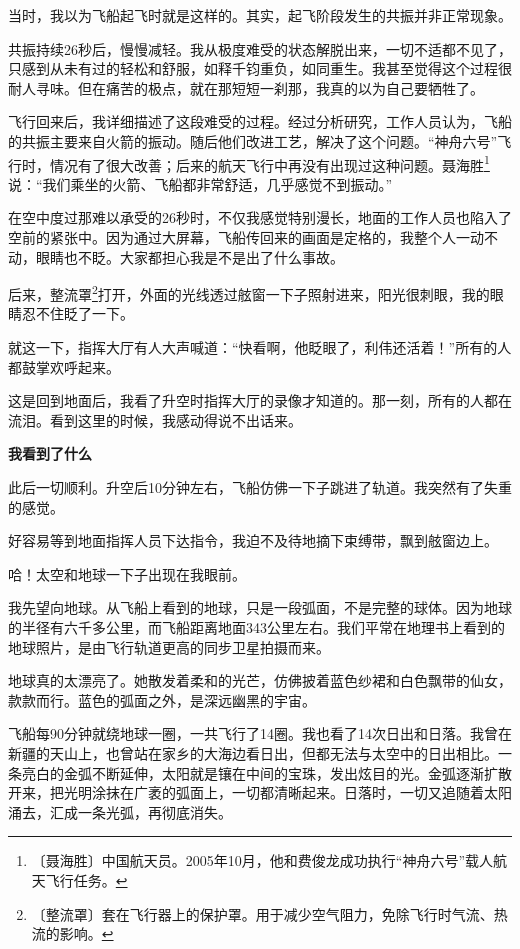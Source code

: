 \documentclass[12pt,UTF-8,openany]{ctexbook}
\begin{document}
\begin{normalsize}
    当时，我以为飞船起飞时就是这样的。其实，起飞阶段发生的共振并非正常现象。
    
    共振持续26秒后，慢慢减轻。我从极度难受的状态解脱出来，一切不适都不见了，只感到从未有过的轻松和舒服，如释千钧重负，如同重生。我甚至觉得这个过程很耐人寻味。但在痛苦的极点，就在那短短一刹那，我真的以为自己要牺牲了。
    
    飞行回来后，我详细描述了这段难受的过程。经过分析研究，工作人员认为，飞船的共振主要来自火箭的振动。随后他们改进工艺，解决了这个问题。“神舟六号”飞行时，情况有了很大改善；后来的航天飞行中再没有出现过这种问题。聂海胜\footnote{〔聂海胜〕中国航天员。2005年10月，他和费俊龙成功执行“神舟六号”载人航天飞行任务。}说：“我们乘坐的火箭、飞船都非常舒适，几乎感觉不到振动。”
    
    在空中度过那难以承受的26秒时，不仅我感觉特别漫长，地面的工作人员也陷入了空前的紧张中。因为通过大屏幕，飞船传回来的画面是定格的，我整个人一动不动，眼睛也不眨。大家都担心我是不是出了什么事故。
    
    后来，整流罩\footnote{〔整流罩〕套在飞行器上的保护罩。用于减少空气阻力，免除飞行时气流、热流的影响。}打开，外面的光线透过舷窗一下子照射进来，阳光很刺眼，我的眼睛忍不住眨了一下。
    
    就这一下，指挥大厅有人大声喊道：“快看啊，他眨眼了，利伟还活着！”所有的人都鼓掌欢呼起来。
    
    这是回到地面后，我看了升空时指挥大厅的录像才知道的。那一刻，所有的人都在流泪。看到这里的时候，我感动得说不出话来。
    
    \begin{large}\textbf{我看到了什么}\end{large}
    
    此后一切顺利。升空后10分钟左右，飞船仿佛一下子跳进了轨道。我突然有了失重的感觉。
    
    好容易等到地面指挥人员下达指令，我迫不及待地摘下束缚带，飘到舷窗边上。
    
    哈！太空和地球一下子出现在我眼前。
    
    我先望向地球。从飞船上看到的地球，只是一段弧面，不是完整的球体。因为地球的半径有六千多公里，而飞船距离地面343公里左右。我们平常在地理书上看到的地球照片，是由飞行轨道更高的同步卫星拍摄而来。
    
    地球真的太漂亮了。她散发着柔和的光芒，仿佛披着蓝色纱裙和白色飘带的仙女，款款而行。蓝色的弧面之外，是深远幽黑的宇宙。
    
    飞船每90分钟就绕地球一圈，一共飞行了14圈。我也看了14次日出和日落。我曾在新疆的天山上，也曾站在家乡的大海边看日出，但都无法与太空中的日出相比。一条亮白的金弧不断延伸，太阳就是镶在中间的宝珠，发出炫目的光。金弧逐渐扩散开来，把光明涂抹在广袤的弧面上，一切都清晰起来。日落时，一切又追随着太阳涌去，汇成一条光弧，再彻底消失。
    

\end{normalsize}
\end{document}
